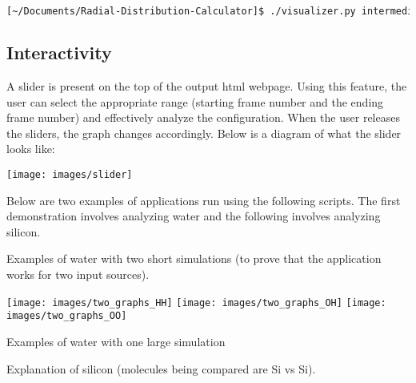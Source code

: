 \begin{lstlisting}[language=bash, caption=Running the visualizer script.]
[~/Documents/Radial-Distribution-Calculator]$ ./visualizer.py intermediate_files/cum_counts.txt intermediate_files/cum_counts2.txt 
\end{lstlisting}


\subsection*{Interactivity}

A slider is present on the top of the output html webpage. Using this feature, the user can select the appropriate range (starting frame number and the ending frame number) and effectively analyze the configuration. When the user releases the sliders, the graph changes accordingly. Below is a diagram of what the slider looks like:


\texttt{[image: images/slider]}



Below are two examples of applications run using the following scripts. The first demonstration involves analyzing water and the following involves analyzing silicon. 



Examples of water with two short simulations (to prove that the application works for two input sources).

\texttt{[image: images/two\_graphs\_HH]}
\texttt{[image: images/two\_graphs\_OH]}
\texttt{[image: images/two\_graphs\_OO]}



Examples of water with one large simulation




Explanation of silicon (molecules being compared are Si vs Si).


